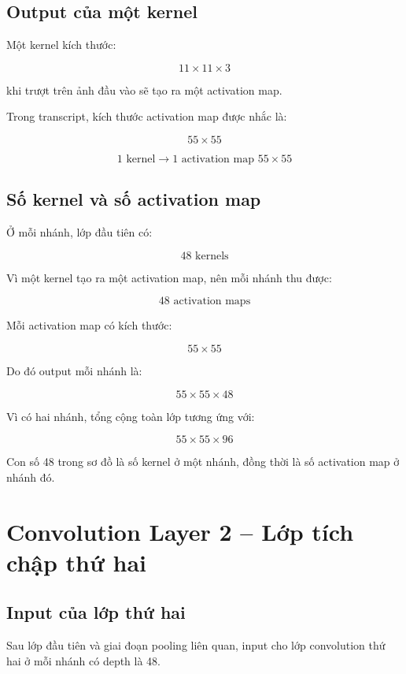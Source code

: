 \subsection{Output của một kernel}

Một kernel kích thước:

\[
    11\times11\times3
\]

khi trượt trên ảnh đầu vào sẽ tạo ra một activation map.

Trong transcript, kích thước activation map được nhắc là:

\[
    55\times55
\]

\[
    1 \text{ kernel}
    \rightarrow
    1 \text{ activation map } 55\times55
\]

\subsection{Số kernel và số activation map}

Ở mỗi nhánh, lớp đầu tiên có:

\[
    48 \text{ kernels}
\]

Vì một kernel tạo ra một activation map, nên mỗi nhánh thu được:

\[
    48 \text{ activation maps}
\]

Mỗi activation map có kích thước:

\[
    55\times55
\]

Do đó output mỗi nhánh là:

\[
    55\times55\times48
\]

Vì có hai nhánh, tổng cộng toàn lớp tương ứng với:

\[
    55\times55\times96
\]

\begin{ghinho}
Con số 48 trong sơ đồ là số kernel ở một nhánh, đồng thời là số activation map ở nhánh đó.
\end{ghinho}

\section{Convolution Layer 2 -- Lớp tích chập thứ hai}

\subsection{Input của lớp thứ hai}

Sau lớp đầu tiên và giai đoạn pooling liên quan, input cho lớp convolution thứ hai ở mỗi nhánh có depth là 48.

